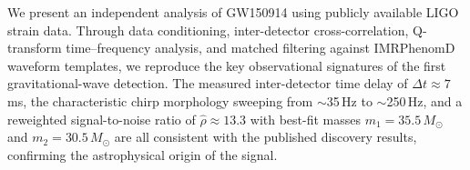 We present an independent analysis of GW150914 using publicly available LIGO strain data.
Through data conditioning, inter-detector cross-correlation, Q-transform time--frequency
analysis, and matched filtering against IMRPhenomD waveform templates, we reproduce the
key observational signatures of the first gravitational-wave detection. The measured
inter-detector time delay of $\Delta t \approx 7$\,ms, the characteristic chirp morphology
sweeping from $\sim$35\,Hz to $\sim$250\,Hz, and a reweighted signal-to-noise ratio of
$\hat{\rho} \approx 13.3$ with best-fit masses $m_1 = 35.5\,M_\odot$ and
$m_2 = 30.5\,M_\odot$ are all consistent with the published discovery results, confirming
the astrophysical origin of the signal.
